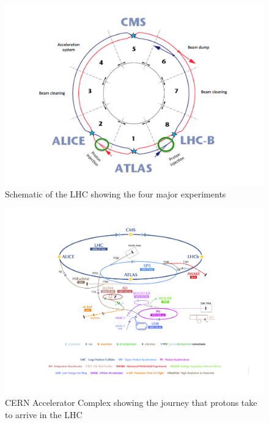 \begin{figure}
    \centering
    \includegraphics[width=\textwidth]{figures/png/LHC Schematic.png}
    \caption{Schematic of the LHC showing the four major experiments}\label{fig:LHCSchematic}
\end{figure}

\begin{figure}
    \centering
    \includegraphics[width=\textwidth]{figures/png/CERN Accelerator Complex.jpg}
    \caption{CERN Accelerator Complex showing the journey that protons take to
    arrive in the LHC~\cite{CERNComplex}}\label{fig:CERNComplex}
\end{figure}

